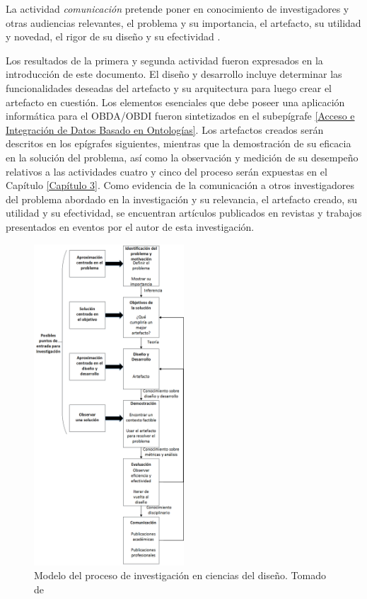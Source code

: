 La actividad \textit{comunicación} pretende poner en conocimiento de investigadores y otras audiencias relevantes, el problema y su importancia, el artefacto, su utilidad y novedad, el rigor de su diseño y su efectividad \citep{Peffers2006}.

Los resultados de la primera y segunda actividad fueron expresados en la introducción de este documento. El diseño y desarrollo incluye determinar las funcionalidades deseadas del artefacto y su arquitectura para luego crear el artefacto en cuestión. Los elementos esenciales que debe poseer una aplicación informática para el OBDA/OBDI fueron sintetizados en el subepígrafe \ref{Acceso e Integración de Datos Basado en Ontologías}. Los artefactos creados serán descritos en los epígrafes siguientes, mientras que la demostración de su eficacia en la solución del problema, así como la observación y medición de su desempeño relativos a las actividades cuatro y cinco del proceso serán expuestas en el Capítulo \ref{Capítulo 3}. Como evidencia de la comunicación a otros investigadores del problema abordado en la investigación y su relevancia, el artefacto creado, su utilidad y su efectividad, se encuentran artículos publicados en revistas y trabajos presentados en eventos por el autor de esta investigación.

\begin{figure}
\begin{center}
	\includegraphics[width=0.5\textwidth]{img/DSRPmodel.png}
\end{center}
\caption{Modelo del proceso de investigación en ciencias del diseño. Tomado de \cite{Peffers2006}}
\label{fig: dsrp}
\end{figure}

